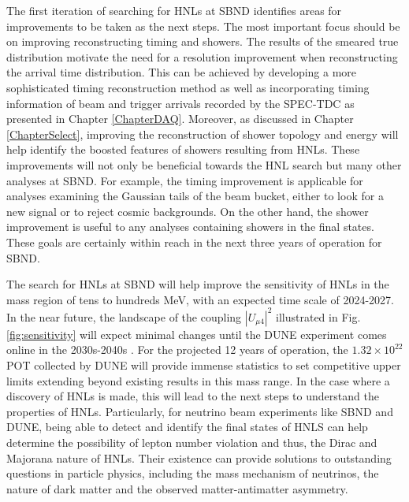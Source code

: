 The first iteration of searching for HNLs at SBND identifies areas for improvements to be taken as the next steps.
The most important focus should be on improving reconstructing timing and showers.
The results of the smeared true distribution motivate the need for a resolution improvement when reconstructing the arrival time distribution.
This can be achieved by developing a more sophisticated timing reconstruction method as well as incorporating timing information of beam and trigger arrivals recorded by the SPEC-TDC as presented in 
Chapter \ref{ChapterDAQ}.
Moreover, as discussed in Chapter \ref{ChapterSelect}, improving the reconstruction of shower topology and energy will help identify the boosted features of showers resulting from HNLs.
These improvements will not only be beneficial towards the HNL search but many other analyses at SBND.
For example, the timing improvement is applicable for analyses examining the Gaussian tails of the beam bucket, either to look for a new signal or to reject cosmic backgrounds.
On the other hand, the shower improvement is useful to any analyses containing showers in the final states.
These goals are certainly within reach in the next three years of operation for SBND.

The search for HNLs at SBND will help improve the sensitivity of HNLs in the mass region of tens to hundreds MeV, with an expected time scale of 2024-2027.
In the near future, the landscape of the coupling $|U_{\mu4}|^2$ illustrated in Fig. \ref{fig:sensitivity} will expect minimal changes until the DUNE experiment comes online in the 2030s-2040s \cite{HNLSilvia, HNLPresentFuture}.
For the projected 12 years of operation, the $1.32 \times 10^{22}$ POT collected by DUNE will provide immense statistics to set competitive upper limits extending beyond existing results in this mass range.
In the case where a discovery of HNLs is made, this will lead to the next steps to understand the properties of HNLs.
Particularly, for neutrino beam experiments like SBND and DUNE, being able to detect and identify the final states of HNLS can help determine the possibility of lepton number violation and thus, the 
Dirac and Majorana nature of HNLs.
Their existence can provide solutions to outstanding questions in particle physics, including the mass mechanism of neutrinos, the nature of dark matter and the observed matter-antimatter asymmetry.
